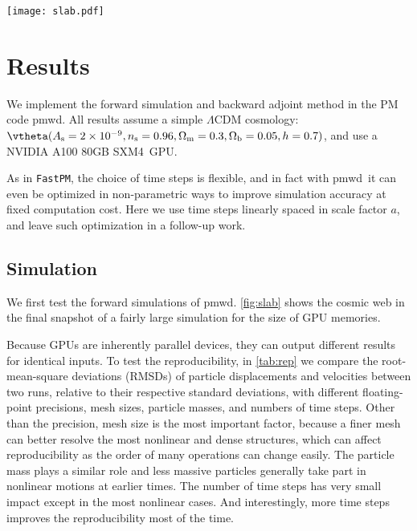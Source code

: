 \documentclass[modern, trackchanges, dvipsnames]{aastex631}
\newcommand{\pmwd}{{\usefont{T1}{nova}{m}{sl}pmwd}}
\newcommand{\As}{A_\mathrm{s}}
\newcommand{\ns}{n_\mathrm{s}}
\newcommand{\Omegam}{\Omega_\mathrm{m}}
\newcommand{\Omegab}{\Omega_\mathrm{b}}
\newcommand{\Mpc}{\mathrm{Mpc}}
\newcommand{\GPU}{NVIDIA A100 80GB SXM4}
\begin{document}
\begin{figure*}[t]
\centering
\texttt{[image: slab.pdf]}
\caption{Relative matter density field, $1+\delta$, at $a=1$, projected
from an $8\,\Mpc/h$ thick slab in a \pmwd\ simulation, that has evolved
$512^3$ particles with single precision and a $1024^3$ mesh in a
$(512\,\Mpc/h)^3$ box for 63 time steps.
The simulation takes only 20 seconds to finish on a \GPU\ GPU.
}
\label{fig:slab}
\end{figure*}


\vspace{1em}
\section{Results}

We implement the forward simulation and backward adjoint method in the
PM code \pmwd.
All results assume a simple $\Lambda$CDM cosmology: $\vtheta (\As =
2\times10^{-9}, \ns = 0.96, \Omegam = 0.3, \Omegab = 0.05, h = 0.7)$,
and use a \GPU\ GPU.

As in \texttt{FastPM}, the choice of time steps is flexible, and in fact
with \pmwd\ it can even be optimized in non-parametric ways to improve
simulation accuracy at fixed computation cost.
Here we use time steps linearly spaced in scale factor $a$, and leave
such optimization in a follow-up work.


\vspace{1em}
\subsection{Simulation}

We first test the forward simulations of \pmwd.
\autoref{fig:slab} shows the cosmic web in the final snapshot of a
fairly large simulation for the size of GPU memories.

Because GPUs are inherently parallel devices, they can output different
results for identical inputs.
To test the reproducibility, in \autoref{tab:rep} we compare the
root-mean-square deviations (RMSDs) of particle displacements and
velocities between two runs, relative to their respective standard
deviations, with different floating-point precisions, mesh sizes,
particle masses, and numbers of time steps.
Other than the precision, mesh size is the most important factor,
because a finer mesh can better resolve the most nonlinear and dense
structures, which can affect reproducibility as the order of many
operations can change easily.
The particle mass plays a similar role and less massive particles
generally take part in nonlinear motions at earlier times.
The number of time steps has very small impact except in the most
nonlinear cases.
And interestingly, more time steps improves the reproducibility most of
the time.
\end{document}
